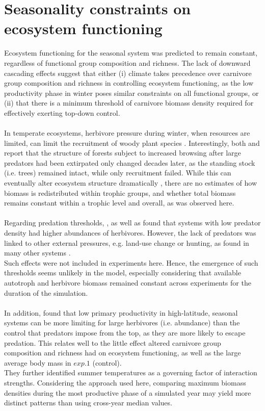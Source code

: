 \section{Seasonality constraints on ecosystem functioning}
Ecosystem functioning for the seasonal system was predicted to remain constant, regardless of functional group composition and richness. The lack of downward cascading effects suggest that either (i) climate takes precedence over carnivore group composition and richness in controlling ecosystem functioning, as the low productivity phase in winter poses similar constraints on all functional groups, or (ii) that there is a minimum threshold of carnivore biomass density required for effectively exerting top-down control.\\\\
In temperate ecosystems, herbivore pressure during winter, when resources are limited, can limit the recruitment of woody plant species \citep{Ripple2014}.
Interestingly, both \cite{Casabon2007} and \citep{Beschta2009} report that the structure of forests subject to increased browsing after large predators had been extirpated only changed decades later, as the standing stock (i.e. trees) remained intact, while only recruitment failed.
While this can eventually alter ecosystem structure dramatically \citep{Terborgh2001, Estes2011}, there are no estimates of how biomass is redistributed within trophic groups, and whether total biomass remains constant within a trophic level and overall, as was observed here. \\\\
Regarding predation thresholds, \cite{Ripple2012}, as well as \cite{Johnson2009} found that systems with low predator density had higher abundances of herbivores. However, the lack of predators was linked to other external pressures, e.g. land-use change or hunting, as found in many other systems \citep{Estes2011,Ripple2014}. \\
Such effects were not included in experiments here. Hence, the emergence of such thresholds seems unlikely in the model, especially considering that available autotroph and herbivore biomass remained constant across experiments for the duration of the simulation.  \\\\
In addition,  \cite{Legagneux2014} found that low primary productivity in high-latitude, seasonal systems can be more limiting for large herbivores (i.e. abundance) than the control that predators impose from the top, as they are more likely to escape predation. 
This relates well to the little effect altered carnivore group composition and richness had on ecosystem functioning, as well as the large average body mass in $exp. 1$ (control). \\
They further identified summer temperatures as a governing factor of interaction strengths. Considering the approach used here, comparing maximum biomass densities during the most productive phase of a simulated year may yield more distinct patterns than using cross-year median values.
